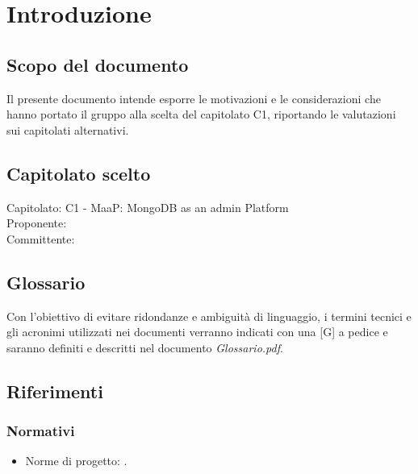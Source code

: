 \section{Introduzione}

\subsection{Scopo del documento}
Il presente documento intende esporre le motivazioni e le considerazioni che hanno portato il gruppo alla scelta del capitolato C1, riportando le valutazioni sui capitolati alternativi.

\subsection{Capitolato scelto}
Capitolato: C1 - MaaP: MongoDB as an admin Platform\\
Proponente: \Proponente \\
Committente: \Committente\\

\subsection{Glossario}
Con l'obiettivo di evitare ridondanze e ambiguità di linguaggio, i termini tecnici e gli acronimi utilizzati nei documenti verranno indicati con una [G] a pedice e saranno definiti e descritti  nel documento \emph{Glossario.pdf}. 

\subsection{Riferimenti}

	\subsubsection{Normativi}
	\begin{itemize}
		\item Norme di progetto: \NormeDiProgetto .
	\end{itemize}

